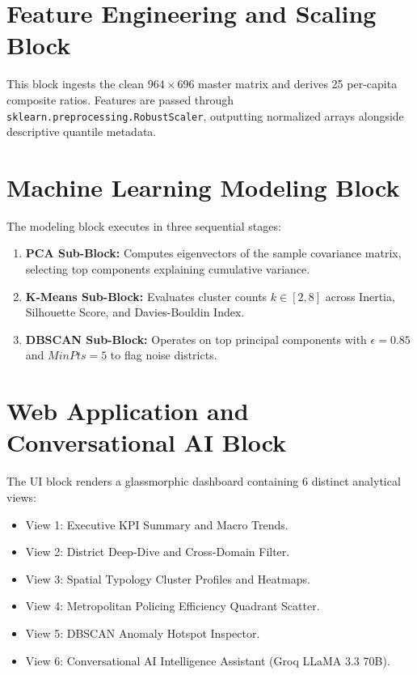 \documentclass[12pt,a4paper]{report}
\begin{document}
\section{Feature Engineering and Scaling Block}
This block ingests the clean $964 \times 696$ master matrix and derives 25 per-capita composite ratios. Features are passed through \texttt{sklearn.preprocessing.RobustScaler}, outputting normalized arrays alongside descriptive quantile metadata.

\section{Machine Learning Modeling Block}
The modeling block executes in three sequential stages:
\begin{enumerate}[leftmargin=*]
    \item \textbf{PCA Sub-Block:} Computes eigenvectors of the sample covariance matrix, selecting top components explaining cumulative variance.
    \item \textbf{K-Means Sub-Block:} Evaluates cluster counts $k \in [2, 8]$ across Inertia, Silhouette Score, and Davies-Bouldin Index.
    \item \textbf{DBSCAN Sub-Block:} Operates on top principal components with $\epsilon = 0.85$ and $MinPts = 5$ to flag noise districts.
\end{enumerate}

\section{Web Application and Conversational AI Block}
The UI block renders a glassmorphic dashboard containing 6 distinct analytical views:
\begin{itemize}[leftmargin=*]
    \item View 1: Executive KPI Summary and Macro Trends.
    \item View 2: District Deep-Dive and Cross-Domain Filter.
    \item View 3: Spatial Typology Cluster Profiles and Heatmaps.
    \item View 4: Metropolitan Policing Efficiency Quadrant Scatter.
    \item View 5: DBSCAN Anomaly Hotspot Inspector.
    \item View 6: Conversational AI Intelligence Assistant (Groq LLaMA 3.3 70B).
\end{itemize}

\end{document}
